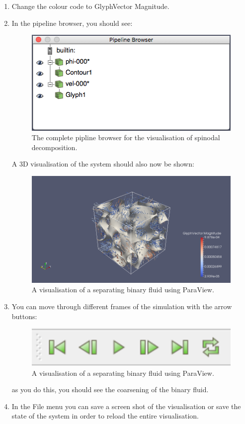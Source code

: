 \documentclass[11pt,twoside,a4paper]{article}
\begin{document}
\begin{enumerate}
\begin{enumerate}
\item Change the colour code to GlyphVector Magnitude.
\item In the pipeline browser, you should see:

\begin{figure}[H]
\begin{center}
\includegraphics[width=0.6\linewidth]{pipeline.png}
  \caption{The complete pipline browser for the visualisation of spinodal decomposition.}
  \label{fig:pipeline}
  \end{center}
\end{figure}

A 3D visualisation of the system should also now be shown:

\begin{figure}[H]
\begin{center}
\includegraphics[width=0.6\linewidth]{system.png}
  \caption{A visualisation of a separating binary fluid using ParaView.}
  \label{fig:sysVisualisation}
  \end{center}
\end{figure}

\item You can move through different frames of the simulation with the arrow buttons:

\begin{figure}[H]
\begin{center}
\includegraphics[width=0.4\linewidth]{arrows.png}
  \caption{A visualisation of a separating binary fluid using ParaView.}
  \label{fig:sysVisualisation}
  \end{center}
\end{figure}

as you do this, you should see the coarsening of the binary fluid.

\item In the File menu you can save a screen shot of the visualisation or save the state of the system in order to reload the entire visualisation.
\end{enumerate}
\end{enumerate} 

%
\end{document}
